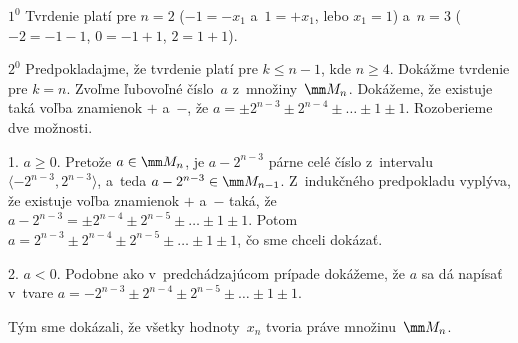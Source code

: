 {$1^0$ Tvrdenie platí pre $n = 2$ ($-1=-x_1$ a~$1=+x_1$, lebo
$x_1=1$) a~$n=3$ ($-2=-1-1$, $0=-1+1$, $2=1+1$).

$2^0$ Predpokladajme, že tvrdenie platí pre $k \le n-1$, kde $n\ge4$.
Dokážme tvrdenie pre $k = n$. Zvoľme ľubovoľné číslo~$a$ z~množiny~$\mm M_n$.
Dokážeme, že existuje taká voľba znamienok $+$ a~$-$,
že $a = \pm 2^{n - 3} \pm 2^{n - 4} \pm \dots \pm 1 \pm 1$.
Rozoberieme dve možnosti.

1. {$a \ge 0$}. Pretože $a \in\mm M_n$, je $a - 2^{n - 3}$ párne
celé číslo z~intervalu $\langle -2^{n - 3}, 2^{n - 3}\rangle$, 
a~teda $a - 2^{n - 3} \in\mm M_{n - 1}$. Z~indukčného predpokladu
vyplýva, že existuje voľba znamienok $+$ a~$-$ taká, že $a -
2^{n-3} = \pm 2^{n - 4} \pm 2^{n - 5} \pm \dots \pm 1 \pm 1$.
Potom $a = 2^{n - 3} \pm 2^{n - 4} \pm 2^{n - 5} \pm \dots \pm 1
\pm 1$, čo sme chceli dokázať.

2. {$a < 0$}. Podobne ako v~predchádzajúcom prípade dokážeme, že
$a$ sa dá napísať v~tvare $a = -2^{n - 3} \pm 2^{n - 4} \pm
2^{n-5} \pm \dots \pm 1 \pm 1$.

Tým sme dokázali, že všetky hodnoty~$x_n$ tvoria práve množinu~$\mm M_n$.}


